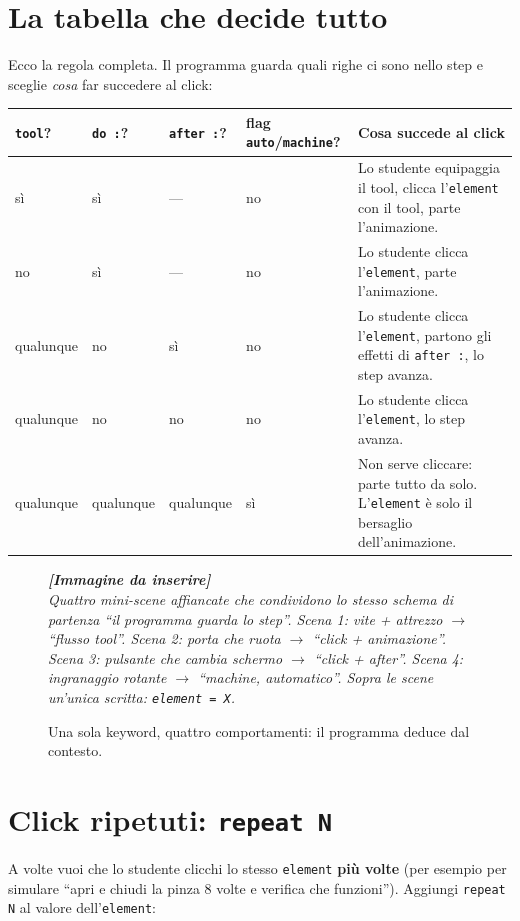 ﻿\documentclass[a4paper,12pt,oneside]{book}
\newcommand{\kw}[1]{\texttt{\color{keycolor}#1}}
\newcommand{\val}[1]{\texttt{\color{cvtgreen}#1}}
\newcommand{\imgph}[2]{%
  \begin{tcolorbox}[colback=cvtlightblue!30,colframe=cvtblue!40,%
    width=#1,halign=center,valign=center,height=5cm,boxrule=0.5pt,arc=3pt]%
    \textcolor{cvtgray}{\itshape\footnotesize\textbf{[Immagine da inserire]}\\[3pt]#2}%
  \end{tcolorbox}}
\begin{document}
\section{La tabella che decide tutto}

Ecco la regola completa. Il programma guarda quali righe ci sono nello step e
sceglie \emph{cosa} far succedere al click:

\begin{longtable}{@{}p{2.4cm}p{2.4cm}p{2.4cm}p{2.4cm}p{4.0cm}@{}}
\toprule
\textbf{\kw{tool}?} & \textbf{\kw{do :}?} & \textbf{\kw{after :}?} & \textbf{flag \val{auto}/\val{machine}?} & \textbf{Cosa succede al click} \\
\midrule
sì & sì & --- & no & Lo studente equipaggia il tool, clicca l'\kw{element} con il tool, parte l'animazione. \\
no & sì & --- & no & Lo studente clicca l'\kw{element}, parte l'animazione. \\
qualunque & no & sì & no & Lo studente clicca l'\kw{element}, partono gli effetti di \kw{after :}, lo step avanza. \\
qualunque & no & no & no & Lo studente clicca l'\kw{element}, lo step avanza. \\
qualunque & qualunque & qualunque & sì & Non serve cliccare: parte tutto da solo. L'\kw{element} è solo il bersaglio dell'animazione. \\
\bottomrule
\end{longtable}

\begin{figure}[H]
  \centering
  \imgph{13cm}{Quattro mini-scene affiancate che condividono lo stesso schema di partenza ``il programma guarda lo step''. Scena 1: vite + attrezzo $\to$ ``flusso tool''. Scena 2: porta che ruota $\to$ ``click + animazione''. Scena 3: pulsante che cambia schermo $\to$ ``click + after''. Scena 4: ingranaggio rotante $\to$ ``machine, automatico''. Sopra le scene un'unica scritta: \kw{element = X}.}
  \caption{Una sola keyword, quattro comportamenti: il programma deduce dal contesto.}
  \label{fig:element-unificato}
\end{figure}

\section{Click ripetuti: \texttt{repeat N}}

A volte vuoi che lo studente clicchi lo stesso \kw{element} \textbf{più volte}
(per esempio per simulare ``apri e chiudi la pinza 8 volte e verifica che
funzioni''). Aggiungi \val{repeat N} al valore dell'\kw{element}:
\end{document}
